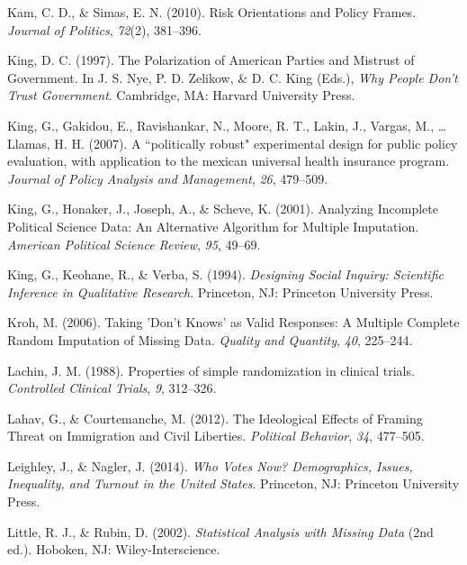 \documentclass[12pt,econ]{sources/authesis}
\begin{document}
\leavevmode\hypertarget{ref-kam_risk_2010}{}%
Kam, C. D., \& Simas, E. N. (2010). Risk Orientations and Policy Frames. \emph{Journal of Politics}, \emph{72}(2), 381--396.

\leavevmode\hypertarget{ref-king_polarization_1997}{}%
King, D. C. (1997). The Polarization of American Parties and Mistrust of Government. In J. S. Nye, P. D. Zelikow, \& D. C. King (Eds.), \emph{Why People Don't Trust Government}. Cambridge, MA: Harvard University Press.

\leavevmode\hypertarget{ref-king_a-politically_2007}{}%
King, G., Gakidou, E., Ravishankar, N., Moore, R. T., Lakin, J., Vargas, M., \ldots{} Llamas, H. H. (2007). A ``politically robust" experimental design for public policy evaluation, with application to the mexican universal health insurance program. \emph{Journal of Policy Analysis and Management}, \emph{26}, 479--509.

\leavevmode\hypertarget{ref-king_2001_analyzing}{}%
King, G., Honaker, J., Joseph, A., \& Scheve, K. (2001). Analyzing Incomplete Political Science Data: An Alternative Algorithm for Multiple Imputation. \emph{American Political Science Review}, \emph{95}, 49--69.

\leavevmode\hypertarget{ref-king_designing_1994}{}%
King, G., Keohane, R., \& Verba, S. (1994). \emph{Designing Social Inquiry: Scientific Inference in Qualitative Research}. Princeton, NJ: Princeton University Press.

\leavevmode\hypertarget{ref-kroh_2006_taking}{}%
Kroh, M. (2006). Taking 'Don't Knows' as Valid Responses: A Multiple Complete Random Imputation of Missing Data. \emph{Quality and Quantity}, \emph{40}, 225--244.

\leavevmode\hypertarget{ref-lachin_1988_properties}{}%
Lachin, J. M. (1988). Properties of simple randomization in clinical trials. \emph{Controlled Clinical Trials}, \emph{9}, 312--326.

\leavevmode\hypertarget{ref-lahav_ideological_2012}{}%
Lahav, G., \& Courtemanche, M. (2012). The Ideological Effects of Framing Threat on Immigration and Civil Liberties. \emph{Political Behavior}, \emph{34}, 477--505.

\leavevmode\hypertarget{ref-leighley_who_2014}{}%
Leighley, J., \& Nagler, J. (2014). \emph{Who Votes Now? Demographics, Issues, Inequality, and Turnout in the United States}. Princeton, NJ: Princeton University Press.

\leavevmode\hypertarget{ref-little_2002_statistical}{}%
Little, R. J., \& Rubin, D. (2002). \emph{Statistical Analysis with Missing Data} (2nd ed.). Hoboken, NJ: Wiley-Interscience.
\end{document}
